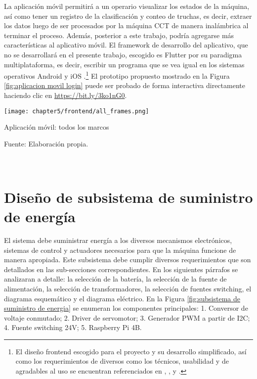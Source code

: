 La aplicación móvil permitirá a un operario visualizar los estados de la máquina, así como tener un registro de la clasificación y conteo de truchas, es decir, extraer los datos luego de ser procesados por la máquina CCT de manera inalámbrica al terminar el proceso. Además, posterior a este trabajo, podría agregarse más características al aplicativo móvil. El framework de desarrollo del aplicativo, que no se desarrollará en el presente trabajo, escogido es Flutter por su paradigma multiplataforma, es decir, escribir un programa que se vea igual en los sistemas operativos Android y iOS \cite{Simone2020}.\footnote{El diseño frontend escogido para el proyecto y su desarrollo simplificado, así como los requerimientos de diversos como los técnicos, usabilidad y de agradables al uso se encuentran referenciados en \cite{Joekman2010}, \cite{PrajyotMainkar2019}, \cite{Churchill2016} y \cite{Neil2012}.} El prototipo propuesto mostrado en la Figura \ref{fig:aplicacion movil login} puede ser probado de forma interactiva directamente haciendo clic en \href{https://bit.ly/3ko1nG0}{https://bit.ly/3ko1nG0}.

\begin{myfigure}[H]
	\footnotesize\centering
	\texttt{[image: chapter5/frontend/all\_frames.png]}
	\caption{Aplicación móvil: todos los marcos}
	\begin{myflushcenter}
		Fuente: Elaboración propia.
	\end{myflushcenter}
	\label{fig:aplicacion movil login}
\end{myfigure}

\pagestyle{myportland}
\doublespacing
\chapter[\quad\quad\quad\quad ----- Diseño de subsistema de suministro de energía]{\\ Diseño de subsistema de suministro de energía}
\thispagestyle{myportland}
\label{ssec:diseno de subsistema de suministro de energia}

El sistema debe suministrar energía a los diversos mecanismos electrónicos, sistemas de control y actuadores necesarios para que la máquina funcione de manera apropiada. Este subsistema debe cumplir diversos requerimientos que son detallados en las sub-secciones correspondientes. En los siguientes párrafos se analizaran a detalle: la selección de la batería, la selección de la fuente de alimentación, la selección de transformadores, la selección de fuentes switching, el diagrama esquemático y el diagrama eléctrico. En la Figura \ref{fig:subsistema de suministro de energia} se enumeran los componentes principales: 1. Conversor de voltaje conmutado; 2. Driver de servomotor; 3. Generador PWM a partir de I2C; 4. Fuente switching 24V; 5. Raspberry Pi 4B.

